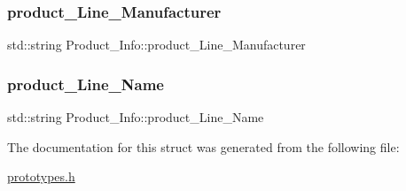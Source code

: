 \mbox{\label{struct_product___info_af1b7675646f89dbc8f73b176085f4150}} 
\subsubsection{\texorpdfstring{product\_Line\_Manufacturer}{product\_Line\_Manufacturer}}
{\footnotesize\ttfamily std\+::string Product\+\_\+\+Info\+::product\+\_\+\+Line\+\_\+\+Manufacturer}

\mbox{\label{struct_product___info_aedcddaa42459b73298bd844a7ed45bdf}} 
\subsubsection{\texorpdfstring{product\_Line\_Name}{product\_Line\_Name}}
{\footnotesize\ttfamily std\+::string Product\+\_\+\+Info\+::product\+\_\+\+Line\+\_\+\+Name}



The documentation for this struct was generated from the following file\+:\begin{DoxyCompactItemize}
\item 
\mbox{\hyperlink{prototypes_8h}{prototypes.\+h}}\end{DoxyCompactItemize}
